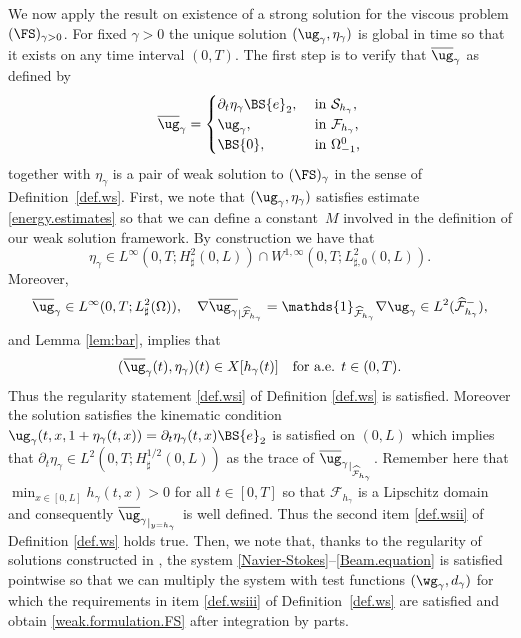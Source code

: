 We now apply the result on existence of a strong solution for the viscous problem $(\FS)_{\gamma>0}$. For fixed $\gamma >0$ the unique solution $(\ug_\gamma,\eta_\gamma)$ is global in time so that it exists on any time interval $(0,T)$.
The first step is to verify that $\overline{\ug}_{\gamma}$ as defined by
\[
\overline{\ug}_{\gamma} =
\begin{cases}
\partial_t \eta_{\gamma} \BS{e}_2, & \text{ in $\mathcal S_{h_{\gamma}}$,} \\
\ug_{\gamma}, & \text{ in $\mathcal F_{h_{\gamma}}$,} \\
\BS{0}, & \text{ in $\Omega_{-1}^0$,}
\end{cases}
\]
together with $\eta_{\gamma}$ is a pair of weak solution
to $(\FS)_{\gamma}$ in the sense of Definition~\ref{def.ws}. First, we note that $(\ug_\gamma,\eta_\gamma)$
satisfies estimate \eqref{energy.estimates} so that we can define a constant~$M$ involved in the definition
of our weak solution framework. By construction we have that
\[
\eta_{\gamma} \in L^{\infty}(0,T;H^{2}_{\sharp}(0,L)) \cap W^{1,\infty}(0,T;L^2_{\sharp, 0}(0,L)).
\]
Moreover, \[
\overline{\ug}_{\gamma} \in L^{\infty}(0,T ; L^2_{\sharp}(\Omega)), \quad
\nabla \overline{\ug_{\gamma}}_{|{\widehat{\mathcal F}_{h_{\gamma}}}} = \mathds{1}_{\widehat{\mathcal F}_{h_{\gamma}}}\nabla \ug_{\gamma} \in L^2(\widehat{\mathcal F}^{-}_{h_{\gamma}}),
\]
and
Lemma \ref{lem:bar}, implies that
\[
(\overline{\ug}_{\gamma}(t),\eta_{\gamma})(t) \in X[h_{\gamma}(t)] \quad\text{for a.e. $t \in (0,T)$}.
\]
Thus the regularity statement \eqref{def.wsi} of Definition \ref{def.ws} is satisfied. Moreover the solution satisfies the kinematic condition $\ug_\gamma(t, x, 1+\eta_\gamma(t, x))=\partial_t\eta_\gamma(t,x)\BS{e}_2$ is satisfied on $(0, L)$ which implies that $\partial_t\eta_\gamma\in L^2(0, T ; H^{1/2}_\sharp(0, L))$ as the trace of ${\overline{\ug}_{\gamma}}_{|_{\widehat{\mathcal F}_{h_\gamma}}}$. Remember here that $\min_{x\in [0, L]} h_\gamma(t,x) >0$ for all $t\in [0, T]$ so that $\mathcal{F}_{h_\gamma}$ is a Lipschitz domain and consequently ${\overline{\ug}_{\gamma}}_{\vert_{y=h_\gamma}}$ is well defined. Thus the second item \eqref{def.wsii} of Definition \ref{def.ws} holds true. Then, we note that, thanks to the regularity of solutions constructed
in \hbox{\cite[Th.\,1]{Grandmont-Hillairet}}, the system \eqref{Navier-Stokes}--\eqref{Beam.equation} is satisfied pointwise so that
we can multiply the system with test functions $(\wg_{\gamma},d_{\gamma})$ for which the requirements in item
\eqref{def.wsiii} of Definition~\ref{def.ws} are satisfied and obtain \eqref{weak.formulation.FS} after integration by parts.

